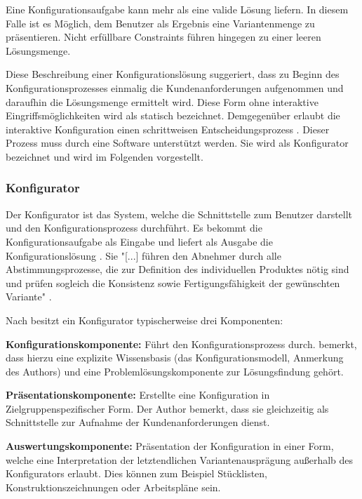\documentclass[12pt,a4paper,bibliography=totocnumbered,listof=totoc]{scrartcl}
\begin{document}
Eine Konfigurationsaufgabe kann mehr als eine valide Lösung liefern. In diesem Falle ist es Möglich, dem Benutzer als Ergebnis eine Variantenmenge zu präsentieren. Nicht erfüllbare Constraints führen hingegen zu einer leeren Lösungsmenge.

Diese Beschreibung einer Konfigurationslösung suggeriert, dass zu Beginn des Konfigurationsprozesses einmalig die Kundenanforderungen aufgenommen und daraufhin die Lösungsmenge ermittelt wird. Diese Form ohne interaktive Eingriffsmöglichkeiten wird als statisch bezeichnet. Demgegenüber erlaubt die interaktive Konfiguration einen schrittweisen Entscheidungsprozess \citep{hadzic04}. Dieser Prozess muss durch eine Software unterstützt werden. Sie wird als Konfigurator bezeichnet und wird im Folgenden vorgestellt.

\subsubsection{Konfigurator}
Der Konfigurator ist das System, welche die Schnittstelle zum Benutzer darstellt und den Konfigurationsprozess durchführt. Es bekommt die Konfigurationsaufgabe als Eingabe und liefert als Ausgabe die Konfigurationslösung \citep{felferning14}. Sie "[...] führen den Abnehmer durch alle Abstimmungsprozesse, die zur Definition des individuellen Produktes nötig sind und prüfen sogleich die Konsistenz sowie Fertigungsfähigkeit der gewünschten Variante" \citep{piller06}.

Nach \citet{piller06} besitzt ein Konfigurator typischerweise drei Komponenten:
\begin{compactitem}
\item \textbf{Konfigurationskomponente:} Führt den Konfigurationsprozess durch. \citet{lutz11} bemerkt, dass hierzu eine explizite Wissensbasis (das Konfigurationsmodell, Anmerkung des Authors) und eine Problemlösungskomponente zur Lösungsfindung gehört.
\item \textbf{Präsentationskomponente:} Erstellte eine Konfiguration in Zielgruppenspezifischer Form. Der Author bemerkt, dass sie gleichzeitig als Schnittstelle zur Aufnahme der Kundenanforderungen dienst.
\item \textbf{Auswertungskomponente:} Präsentation der Konfiguration in einer Form, welche eine Interpretation der letztendlichen Variantenausprägung außerhalb des Konfigurators erlaubt. Dies können zum Beispiel Stücklisten, Konstruktionszeichnungen oder Arbeitspläne sein.
\end{compactitem}
\end{document}
